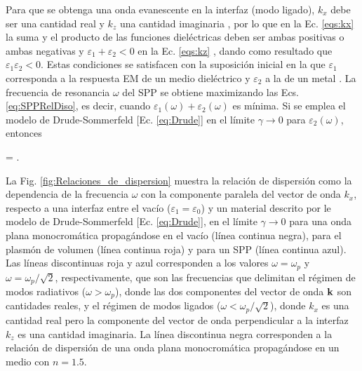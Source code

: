 Para que se obtenga una onda evanescente en la interfaz (modo ligado), $k_x$ debe ser una cantidad real y $k_z$ una cantidad imaginaria \cite{novotny2006principles}, por lo que en la Ec. \eqref{eqs:kx} la suma y el producto de las funciones dieléctricas deben ser ambas positivas o ambas negativas y $\varepsilon_1+\varepsilon_2<0$ en la Ec. \eqref{eqs:kz} \cite{novotny2006principles}, dando como resultado que $\varepsilon_1\varepsilon_2<0$. Estas condiciones se satisfacen con la suposición inicial en la que $\varepsilon_1$ corresponda a la respuesta EM de un medio dieléctrico y $\varepsilon_2$ a la de un metal \cite{novotny2006principles,maier2007plasmonics}. La frecuencia de resonancia $\omega$ del SPP se obtiene maximizando las Ecs. \eqref{eq:SPPRelDiso}, es decir, cuando $\varepsilon_1(\omega)+\varepsilon_2(\omega)$ es mínima. Si se emplea el modelo de Drude-Sommerfeld [Ec. \eqref{eq:Drude}] en el límite $\gamma\to 0$ para $\varepsilon_2(\omega)$, entonces \cite{maier2007plasmonics}  \vspace*{-.75em}
	\begin{tcolorbox}[title =Frecuencia de resonancia del SPP, ams align,  breakable ]
	\omega = .
	\end{tcolorbox}\vspace*{-.75em}\noindent

La Fig. \ref{fig:Relaciones_de_dispersion} muestra la relación de dispersión como la dependencia de la frecuencia $\omega$ con la componente paralela del vector de onda $k_x$, respecto a una interfaz entre el vacío ($\varepsilon_1=\varepsilon_0$) y un material descrito por le modelo de Drude-Sommerfeld [Ec. \eqref{eq:Drude}], en el límite $\gamma\to 0$ para una onda plana monocromática propagándose en el vacío (línea continua negra), para el plasmón de volumen (línea continua roja) y para un SPP (línea continua azul). Las líneas discontinuas roja y azul corresponden a los valores $\omega=\omega_p$ y $\omega=\omega_p/\sqrt{2}$, respectivamente, que son las frecuencias que delimitan el régimen de modos radiativos ($\omega>\omega_p$), donde las dos componentes del vector de onda $\vb{k}$ son cantidades reales, y el régimen de modos ligados ($\omega<\omega_p/\sqrt{2}$), donde $k_x$ es una cantidad real pero la componente del vector de onda perpendicular a la interfaz $k_z$ es una cantidad imaginaria. La línea discontinua negra corresponden a la relación de dispersión de una onda plana monocromática propagándose  en un medio con $n=1.5$.

